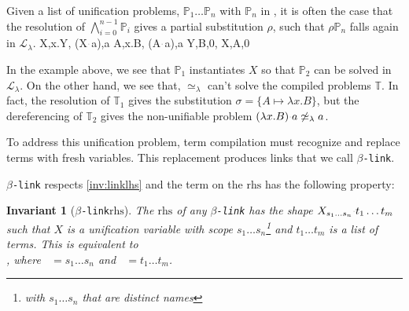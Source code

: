 \documentclass[sigconf,natbib=false,review]{acmart}
\newtheorem{invariant}{Invariant}
\newcommand{\appsep}{\ensuremath{\textcolor{lightgray}{\cdot}}}
\newcommand{\UnifRel}{\ensuremath{\simeq}}
\newcommand{\nUnifRel}{\ensuremath{\not\simeq}}
\newcommand{\Ue}{\ensuremath{\UnifRel_\lambda}\xspace}
\newcommand{\nUe}{\ensuremath{\nUnifRel_\lambda}\xspace}
\newcommand{\llambda}{\ensuremath{\mathcal{L}_\lambda}\xspace}
\newcommand{\linkMacro}[1]{\ensuremath{#1}\texttt{-link}\xspace}
\newcommand{\linkbeta}{\linkMacro{\beta}}
\newcommand{\rhs}{\ensuremath{\mathrm{rhs}}\xspace}
\newcommand{\linkStore}{\ensuremath{\mathbb{L}}\xspace}
\newcommand{\foUnifPb}{\ensuremath{\mathbb{P}}\xspace}
\newcommand{\hoUnifPb}{\ensuremath{\mathbb{T}}\xspace}
\begin{document}
Given a list of unification problems, $\foUnifPb_1\dots
\foUnifPb_n$ with $\foUnifPb_n$ in \notllambda, it is often the case that the resolution of
$\bigwedge_{i=0}^{n-1}\foUnifPb_i$ gives a partial substitution $\rho$, such
that $\rho\foUnifPb_n$ falls again in \llambda.
%
\printAlll
  {{{X,\lambda x.Y},
    {(X\appsep a),a}}}
  {{{A,\lambda x.B},
    {(A\appsep a),a}}}
  {{{Y,B,0},
    {X,A,0}}}
  {{}}

In the example above, we see that $\foUnifPb_1$ instantiates $X$ so that
$\foUnifPb_2$ can be solved in \llambda.
On the other hand, we see that, 
\Ue can't solve the compiled problems \hoUnifPb. In
fact, the resolution of $\hoUnifPb_1$ gives the substitution $\sigma = \{ A
\mapsto \lambda x. B\}$, but the dereferencing of $\hoUnifPb_2$ gives the 
non-unifiable problem $(\lambda x. B) \appsep a \nUe a$.

To address
this unification problem, term compilation must recognize and replace
\notllambda terms with fresh variables.
This replacement produces links that we call \linkbeta.

\linkbeta respects \cref{inv:linklhs} and the term on the \rhs has the
following property:

\newcommand{\rhsBetaHead}{\ensuremath{X_{s_1\dots s_n}}}
\newcommand{\rhsBeta}{\ensuremath{\rhsBetaHead\appsep t_1\dots t_m}\xspace}

\begin{invariant}[\linkbeta \rhs]
  The \rhs of any \linkbeta has the shape \rhsBeta such that $X$ is a
  unification variable with scope $s_1\dots s_n$\footnote{with $s_1\dots s_n$
  that are distinct names} and $t_1\dots t_m$ is a list of terms. This is
  equivalent to \\, where ~$= s_1\dots s_n$
  and ~$=t_1\dots t_m$.
  \label{inv:beta-rhs}
\end{invariant}


\end{document}
